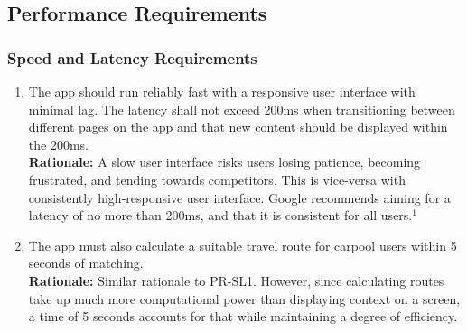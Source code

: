 \documentclass[]{article}
\begin{document}

\subsection{Performance Requirements}
\label{sub:performance_requirements}

\subsubsection{Speed and Latency Requirements}
\label{ssub:speed_and_latency_requirements}
\begin{enumerate}[{PR-SL}1. ]
	\item The app should run reliably fast with a responsive user interface with minimal lag. The latency shall not exceed 200ms when transitioning between different pages on the app and that new content should be displayed within the 200ms.\\
	{\bf Rationale:} A slow user interface risks users losing patience, becoming frustrated, and tending towards competitors. This is vice-versa with consistently high-responsive user interface. Google recommends aiming for a latency of no more than 200ms, and that it is consistent for all users.$^1$
	\item The app must also calculate a suitable travel route for carpool users within 5 seconds of matching.\\
	{\bf Rationale:} Similar rationale to PR-SL1. However, since calculating routes take up much more computational power than displaying context on a screen, a time of 5 seconds accounts for that while maintaining a degree of efficiency.
\end{enumerate}
\end{document}
